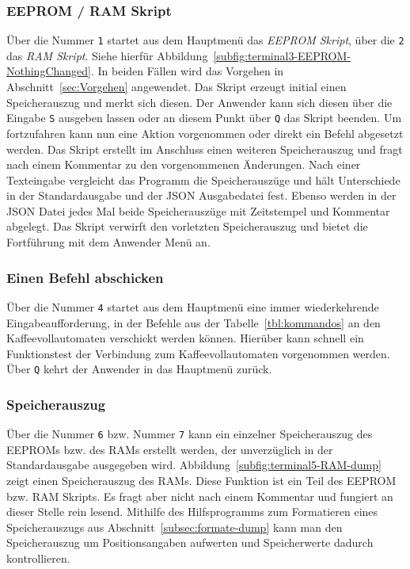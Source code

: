 \subsubsection{EEPROM / RAM Skript}\label{subsubsec:EEPROM-RAM-Skript}
Über die Nummer \texttt{1} startet aus dem Hauptmenü das \textit{EEPROM Skript}, über die \texttt{2} das \textit{RAM Skript}.
Siehe hierfür Abbildung~\ref{subfig:terminal3-EEPROM-NothingChanged}.
In beiden Fällen wird das Vorgehen in Abschnitt~\ref{sec:Vorgehen} angewendet.
Das Skript erzeugt initial einen Speicherauszug und merkt sich diesen.
Der Anwender kann sich diesen über die Eingabe \texttt{S} ausgeben lassen oder an diesem Punkt über \texttt{Q} das Skript beenden.
Um fortzufahren kann nun eine Aktion vorgenommen oder direkt ein Befehl abgesetzt werden.
Das Skript erstellt im Anschluss einen weiteren Speicherauszug und fragt nach einem Kommentar zu den vorgenommenen Änderungen.
Nach einer Texteingabe vergleicht das Programm die Speicherauszüge und hält Unterschiede in der Standardausgabe und der \ac{JSON} Ausgabedatei fest.
Ebenso werden in der \ac{JSON} Datei jedes Mal beide Speicherauszüge mit Zeitstempel und Kommentar abgelegt.
Das Skript verwirft den vorletzten Speicherauszug und bietet die Fortführung mit dem Anwender Menü an.

\subsubsection{Einen Befehl abschicken}
Über die Nummer \texttt{4} startet aus dem Hauptmenü eine immer wiederkehrende Eingabeaufforderung, in der Befehle aus der Tabelle~\ref{tbl:kommandos} an den Kaffeevollautomaten verschickt werden können.
Hierüber kann schnell ein Funktionstest der Verbindung zum Kaffeevollautomaten vorgenommen werden.
Über \texttt{Q} kehrt der Anwender in das Hauptmenü zurück.

\subsubsection{Speicherauszug}
Über die Nummer \texttt{6} bzw. Nummer \texttt{7} kann ein einzelner Speicherauszug des \ac{EEPROM}s bzw. des \ac{RAM}s erstellt werden, der unverzüglich in der Standardausgabe ausgegeben wird.
Abbildung~\ref{subfig:terminal5-RAM-dump} zeigt einen Speicherauszug des \ac{RAM}s.
Diese Funktion ist ein Teil des \ac{EEPROM} bzw. \ac{RAM} Skripts.
Es fragt aber nicht nach einem Kommentar und fungiert an dieser Stelle rein lesend.
Mithilfe des Hilfsprogramms zum Formatieren eines Speicherauszugs aus Abschnitt~\ref{subsec:formate-dump} kann man den Speicherauszug um Positionsangaben aufwerten und Speicherwerte dadurch kontrollieren.

